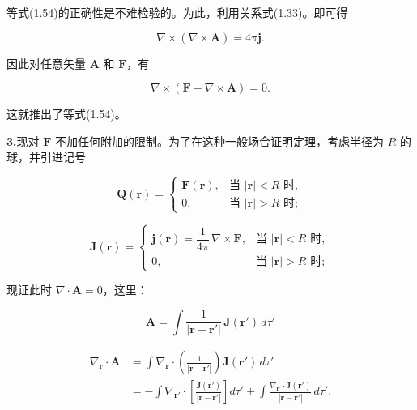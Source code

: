 \documentclass[11pt,a4paper,oneside]{ctexbook}
\newcommand{\ve}[1]{\bm{#1}}
\begin{document}
等式(1.54)的正确性是不难检验的。为此，利用关系式(1.33)。即可得

\begin{equation*}
\nabla \times (\nabla \times \ve{A}) = 4\pi\ve{j}.
\end{equation*}

因此对任意矢量 $\ve{A}$ 和 $\ve{F}$，有

\begin{equation*}
\nabla \times (\ve{F} - \nabla \times \ve{A}) = 0.
\end{equation*}

这就推出了等式(1.54)。

\textbf{3.}\quad 现对 $\ve{F}$ 不加任何附加的限制。为了在这种一般场合证明定理，考虑半径为 $R$ 的球，并引进记号

\begin{equation*}
\ve{Q}(\ve{r}) =
\begin{cases}
\ve{F}(\ve{r}), & \text{当 } |\ve{r}| < R \text{ 时},\\
0, & \text{当 } |\ve{r}| > R \text{ 时};
\end{cases}
\end{equation*}

\begin{equation*}
\ve{J}(\ve{r}) =
\begin{cases}
\ve{j}(\ve{r}) = \dfrac{1}{4\pi}\, \nabla \times \ve{F}, & \text{当 } |\ve{r}| < R \text{ 时},\\
0, & \text{当 } |\ve{r}| > R \text{ 时};
\end{cases}
\end{equation*}

现证此时 $\nabla \cdot \ve{A} = 0$，这里：

\begin{equation*}
\ve{A} = \int \frac{1}{|\ve{r} - \ve{r}'|}\, \ve{J}(\ve{r}')\, d\tau'
\end{equation*}

\begin{equation*}
\begin{aligned}
\nabla_{\ve{r}} \cdot \ve{A} &= \int \nabla_{\ve{r}} \cdot \left(\frac{1}{|\ve{r} - \ve{r}'|}\right) \ve{J}(\ve{r}')\, d\tau'\\
&= -\int \nabla_{\ve{r}'} \cdot \left[\frac{\ve{J}(\ve{r}')}{|\ve{r} - \ve{r}'|}\right] d\tau' + \int \frac{\nabla_{\ve{r}'} \cdot \ve{J}(\ve{r}')}{|\ve{r} - \ve{r}'|}\, d\tau'.
\end{aligned}
\end{equation*}
\end{document}
